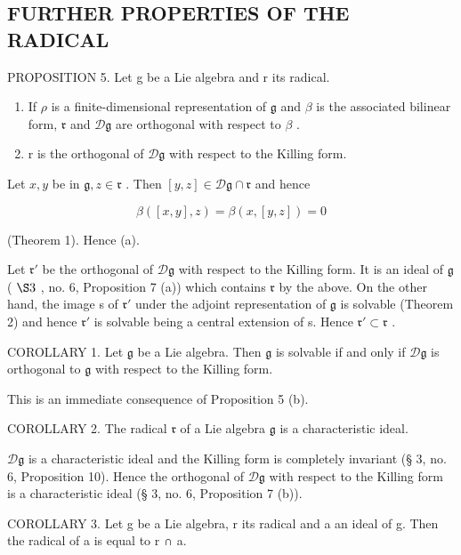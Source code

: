 \subsection{FURTHER PROPERTIES OF THE RADICAL}

PROPOSITION 5. Let g be a Lie algebra and r its radical.

\begin{enumerate}
\def\labelenumi{(\alph{enumi})}
\item
  If \(\rho\) is a finite-dimensional representation of \(\mathfrak{g}\) and \(\beta\) is the associated bilinear form, \(\mathfrak{r}\) and \(\mathcal{D}\mathfrak{g}\) are orthogonal with respect to \(\beta\) .
\item
  r is the orthogonal of \(\mathcal{D}\mathfrak{g}\) with respect to the Killing form.
\end{enumerate}

Let \(x, y\) be in \(\mathfrak{g}, z \in \mathfrak{r}\) . Then \([y, z] \in \mathcal{D}\mathfrak{g} \cap \mathfrak{r}\) and hence

\[
\beta ([ x, y ], z) = \beta (x, [ y, z ]) = 0
\]

(Theorem 1). Hence (a).

Let \(\mathfrak{r}'\) be the orthogonal of \(\mathcal{D}\mathfrak{g}\) with respect to the Killing form. It is an ideal of \(\mathfrak{g}\) ( \(\S 3\) , no. 6, Proposition 7 (a)) which contains \(\mathfrak{r}\) by the above. On the other hand, the image s of \(\mathfrak{r}'\) under the adjoint representation of \(\mathfrak{g}\) is solvable (Theorem 2) and hence \(\mathfrak{r}'\) is solvable being a central extension of s. Hence \(\mathfrak{r}' \subset \mathfrak{r}\) .

COROLLARY 1. Let \(\mathfrak{g}\) be a Lie algebra. Then \(\mathfrak{g}\) is solvable if and only if \(\mathcal{D}\mathfrak{g}\) is orthogonal to \(\mathfrak{g}\) with respect to the Killing form.

This is an immediate consequence of Proposition 5 (b).

COROLLARY 2. The radical \(\mathfrak{r}\) of a Lie algebra \(\mathfrak{g}\) is a characteristic ideal.

\(\mathcal{D}\mathfrak{g}\) is a characteristic ideal and the Killing form is completely invariant (§ 3, no. 6, Proposition 10). Hence the orthogonal of \(\mathcal{D}\mathfrak{g}\) with respect to the Killing form is a characteristic ideal (§ 3, no. 6, Proposition 7 (b)).

COROLLARY 3. Let g be a Lie algebra, r its radical and a an ideal of g. Then the radical of a is equal to r ∩ a.

